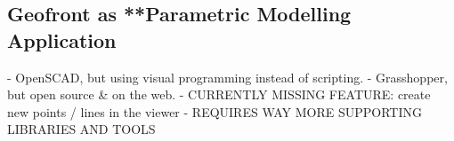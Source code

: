 \subsection{Geofront as **Parametric Modelling Application}
  - OpenSCAD, but using visual programming instead of scripting.
  - Grasshopper, but open source \& on the web.
  - CURRENTLY MISSING FEATURE: create new points / lines in the viewer
  - REQUIRES WAY MORE SUPPORTING LIBRARIES AND TOOLS














